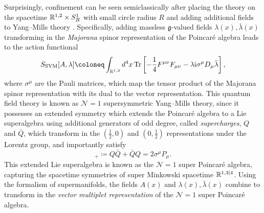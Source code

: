 Surprisingly, confinement can be seen semiclassically after placing the theory on the spacetime $\mathbb{R}^{1,2} \times S_R^1$ with small circle radius $R$ and adding additional fields to Yang--Mills theory \cite{poppitz_continuity_2012}. Specifically, adding massless $\mathfrak{g}$-valued fields $\lambda(x),\bar \lambda(x)$ transforming in the \emph{Majorana} spinor representation of the Poincaré algebra leads to the action functional
\begin{equation}
	S_{\text{SYM}}[A,\lambda] \coloneq \int_{\R^{1,3}} d^4 x \Tr \left[ {-\frac{1}{4}} F^{\mu\nu} F_{\mu\nu} - \lambda \I \sigma^\mu D_\mu \bar \lambda \right],
\end{equation}
where $\sigma^\mu$ are the Pauli matrices, which map the tensor product of the Majorana spinor representation with its dual to the vector representation. This quantum field theory is known as $\mathcal{N}=1$ supersymmetric Yang--Mills theory, since it possesses an extended symmetry which extends the Poincaré algebra to a Lie superalgebra using additional generators of odd degree, called \emph{supercharges}, $Q$ and $\bar Q$, which transform in the $(\tfrac 12,0)$ and $(0,\tfrac 12)$ representations under the Lorentz group, and importantly satisfy
\begin{equation}
	[Q,\bar Q]_+ \coloneq Q \bar Q + \bar Q Q = 2\sigma^\mu P_\mu.
\end{equation}
This extended Lie superalgebra is known as the $\mathcal{N}=1$ super Poincaré algebra, capturing the spacetime symmetries of super Minkowski spacetime $\mathbb{R}^{1,3|4}$. Using the formalism of supermanifolds, the fields $A(x)$ and $\lambda(x),\bar \lambda(x)$ combine to transform in the \emph{vector multiplet representation} of the $\mathcal{N}=1$ super Poincaré algebra.

